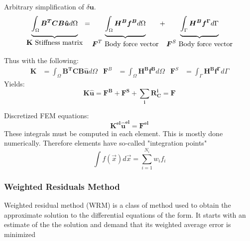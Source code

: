 Arbitrary simplification of $\delta \textbf{u}$.
\begin{equation}
\underbrace{	\int_{\Omega} \boldsymbol{B^TCB}\boldsymbol{\hat{u}} d \Omega \rule[-12pt]{0pt}{5pt}}_{\mbox{\textbf{K} Stiffness matrix}}
=
\underbrace{	\int_{\Omega}\boldsymbol{H^{B} f^B } d\Omega \rule[-12pt]{0pt}{5pt}}_{\mbox{$\boldsymbol{F}^T$ Body force vector}}
+ 
\underbrace{	\int_{\Gamma} \boldsymbol{ H^{B} f^{\Gamma} } d\Gamma \rule[-12pt]{0pt}{5pt}}_{\mbox{$\boldsymbol{F}^S$ Body force vector}}
\end{equation}

Thus with the following:
\begin{align*}
\boldsymbol{K}&=\int_{\Omega} \boldsymbol{B^TCB}\boldsymbol{\hat{u}} d \Omega &	\boldsymbol{F}^B&=\int_{\Omega}\boldsymbol{H^{B} f^B } d\Omega & \boldsymbol{F}^S&=\int_{\Gamma} \boldsymbol{ H^{B} f^{\Gamma} } d\Gamma
\end{align*}
Yields:
\begin{equation}
\boldsymbol{K \hat{u}= F^B + F^S + \sum_{i} R_{C}^{i}= F}
\end{equation}


Discretized FEM equations:
\begin{equation}
\boldsymbol{K^{el} \hat{u}^{el}= F^{el}}
\end{equation}
These integrals must be computed in each element. This is mostly done numerically. Therefore elements have so-called "integration points"
\begin{equation}
\int f(\vec{x})d\vec{x}=\sum_{i=1}^{N_i}w_if_i
\end{equation}

\subsubsection{Weighted Residuals Method}
Weighted residual method (WRM) is a class of method used to obtain the approximate solution
to the differential equations of the form. It starts with an estimate of the the solution and demand that its weighted average error is minimized

